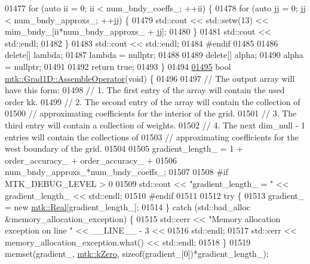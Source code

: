 \begin{DoxyCode}
{{01477   \textcolor{keywordflow}{for} (\textcolor{keyword}{auto} ii = 0; ii < num\_bndy\_coeffs\_; ++ii) \{
01478     \textcolor{keywordflow}{for} (\textcolor{keyword}{auto} jj = 0; jj < num\_bndy\_approxs\_; ++jj) \{
01479       std::cout << std::setw(13) << mim\_bndy\_[ii*num\_bndy\_approxs\_ + jj];
01480     \}
01481     std::cout << std::endl;
01482   \}
01483   std::cout << std::endl;
01484 \textcolor{preprocessor}{  #endif}
01485 
01486   \textcolor{keyword}{delete}[] lambda;
01487   lambda = \textcolor{keyword}{nullptr};
01488 
01489   \textcolor{keyword}{delete}[] alpha;
01490   alpha = \textcolor{keyword}{nullptr};
01491 
01492   \textcolor{keywordflow}{return} \textcolor{keyword}{true};
01493 \}
01494 
\hypertarget{mtk__grad__1d_8cc_source_l01495}{}\hyperlink{classmtk_1_1Grad1D_a4eb4d363506b8c64b2bb18a318bbd259}{01495} \textcolor{keywordtype}{bool} \hyperlink{classmtk_1_1Grad1D_a4eb4d363506b8c64b2bb18a318bbd259}{mtk::Grad1D::AssembleOperator}(\textcolor{keywordtype}{void}) \{
01496 
01497   \textcolor{comment}{// The output array will have this form:}
01498   \textcolor{comment}{// 1. The first entry of the array will contain the used order kk.}
01499   \textcolor{comment}{// 2. The second entry of the array will contain the collection of}
01500   \textcolor{comment}{// approximating coefficients for the interior of the grid.}
01501   \textcolor{comment}{// 3. The third entry will contain a collection of weights.}
01502   \textcolor{comment}{// 4. The next dim\_null - 1 entries will contain the collections of}
01503   \textcolor{comment}{// approximating coefficients for the west boundary of the grid.}
01504 
01505   gradient\_length\_ = 1 + order\_accuracy\_ + order\_accuracy\_ +
01506     num\_bndy\_approxs\_*num\_bndy\_coeffs\_;
01507 
01508 \textcolor{preprocessor}{  #if MTK\_DEBUG\_LEVEL > 0}
01509   std::cout << \textcolor{stringliteral}{"gradient\_length\_ = "} << gradient\_length\_ << std::endl;
01510 \textcolor{preprocessor}{  #endif}
01511 
01512   \textcolor{keywordflow}{try} \{
01513     gradient\_ = \textcolor{keyword}{new} \hyperlink{group__c01-roots_gac080bbbf5cbb5502c9f00405f894857d}{mtk::Real}[gradient\_length\_];
01514   \} \textcolor{keywordflow}{catch} (std::bad\_alloc &memory\_allocation\_exception) \{
01515     std::cerr << \textcolor{stringliteral}{"Memory allocation exception on line "} << \_\_LINE\_\_ - 3 <<
01516       std::endl;
01517     std::cerr << memory\_allocation\_exception.what() << std::endl;
01518   \}
01519   memset(gradient\_, \hyperlink{group__c01-roots_ga59a451a5fae30d59649bcda274fea271}{mtk::kZero}, \textcolor{keyword}{sizeof}(gradient\_[0])*gradient\_length\_);
}}
\end{DoxyCode}
